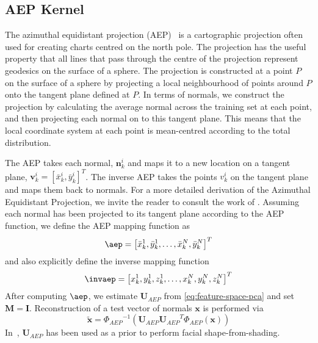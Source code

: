 \subsection{AEP Kernel}\label{subsec:aep-kernel}
The azimuthal equidistant projection (AEP)~\cite{snyder1987map,smith2006recovering} is a
cartographic projection often used for creating charts centred on the north
pole. The projection has the useful property that all lines that pass through
the centre of the projection represent geodesics on the surface of a sphere. The
projection is constructed at a point $P$ on the surface of a sphere by
projecting a local neighbourhood of points around $P$ onto the tangent plane
defined at $P$. In terms of normals, we construct the projection by calculating
the average normal across the training set at each point, and then projecting
each normal on to this tangent plane. This means that the local coordinate
system at each point is mean-centred according to the total distribution.

The AEP takes each normal, $\mathbf{n}_k^i$ and maps it to a new location on
a tangent plane, $\mathbf{v}_k^i = [\bar{x}_k^i, \bar{y}_k^i]^T$. The
inverse AEP takes the points  $v_k^i$ on the tangent plane and maps them back to
normals. For a more detailed derivation of the Azimuthal Equidistant Projection,
we invite the reader to consult the work of \citet{smith2006recovering}. Assuming each
normal has been projected to its tangent plane according to the AEP function, we
define the AEP mapping function as
\begin{equation}\label{eq:aep-kernel}
    \aep = \left[ \bar{x}_k^1, \bar{y}_k^1, \ldots, \bar{x}_k^N, \bar{y}_k^N \right]^T
\end{equation}
and also explicitly define the inverse mapping function
\begin{equation}\label{eq:inv-aep-kernel}
    \invaep = \left[ x_k^1, y_k^1, z_k^1, \dots, x_k^N, y_k^N, z_k^N \right]^T
\end{equation}
After computing $\aep$, we estimate $\mathbf{U}_{AEP}$ from 
\cref{eq:feature-space-pca} and set $\mathbf{M} = \mathbf{I}$. Reconstruction 
of a test vector of normals $\mathbf{x}$ is performed via
\begin{equation}\label{eq:aep-reconstruction}
   \tilde{\mathbf{x}} = {\Phi_{AEP}}^{-1} \left( \mathbf{U}_{AEP} {\mathbf{U}_{AEP}}^T \Phi_{AEP}(\mathbf{x}) \right)
\end{equation}
In~\cite{smith2006recovering}, $\mathbf{U}_{AEP}$ has been used as a prior to
perform facial shape-from-shading.
